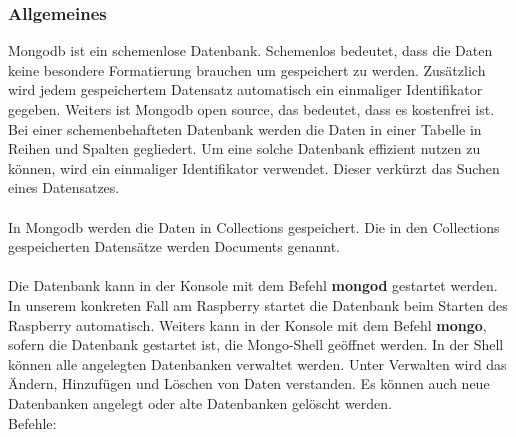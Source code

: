 \subsubsection{Allgemeines}
Mongodb ist ein schemenlose Datenbank. Schemenlos bedeutet, dass die Daten keine besondere Formatierung brauchen um gespeichert zu werden. Zusätzlich wird jedem gespeichertem Datensatz automatisch ein einmaliger Identifikator gegeben. Weiters ist Mongodb open source, das bedeutet, dass es kostenfrei ist.
\\
Bei einer schemenbehafteten Datenbank werden die Daten in einer Tabelle in Reihen und Spalten gegliedert. Um eine solche Datenbank effizient nutzen zu können, wird ein einmaliger Identifikator verwendet. Dieser verkürzt das Suchen eines Datensatzes.
\\ \\ 
In Mongodb werden die Daten in Collections gespeichert. Die in den Collections gespeicherten Datensätze werden Documents genannt. 
\\ \\
Die Datenbank kann in der Konsole mit dem Befehl \textbf{mongod} gestartet werden. In unserem konkreten Fall am Raspberry startet die Datenbank beim Starten des Raspberry automatisch. Weiters kann in der Konsole mit dem Befehl \textbf{mongo}, sofern die Datenbank gestartet ist, die Mongo-Shell geöffnet werden. In der Shell können alle angelegten Datenbanken verwaltet werden. Unter Verwalten wird das Ändern, Hinzufügen und Löschen von Daten verstanden. Es können auch neue Datenbanken angelegt oder alte Datenbanken gelöscht werden. 
\\ Befehle:
